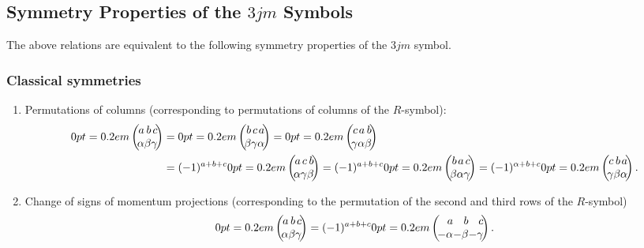 \subsection{Symmetry Properties of the $3 j m$ Symbols}\label{sec:8.4.2}
The above relations are equivalent to the following symmetry properties of the $3 j m$ symbol.

\subsubsection{Classical symmetries \cite{ref110}}
\begin{enumerate}[label=(\roman*)]
\item Permutations of columns (corresponding to permutations of columns of the $R$-symbol):
\begin{align}
\threej{a}{b}{c}{\alpha}{\beta}{\gamma}&=\threej{b}{c}{a}{\beta}{\gamma}{\alpha}=\threej{c}{a}{b}{\gamma}{\alpha}{\beta} \notag\\
& =(-1)^{a+b+c}\threej{a}{c}{b}{\alpha}{\gamma}{\beta}  
 =(-1)^{a+b+c}\threej{b}{a}{c}{\beta}{\alpha}{\gamma}=(-1)^{\alpha+b+c}\threej{c}{b}{a}{\gamma}{\beta}{\alpha}. \label{eq:8:4:5}
\end{align}
\item Change of signs of momentum projections (corresponding to the permutation of the second and third rows of the $R$-symbol)
\begin{equation}
\threej{a}{b}{c}{\alpha}{\beta}{\gamma}=(-1)^{a+b+c}\threej{a}{b}{c}{-\alpha}{-\beta}{-\gamma}. \label{eq:8:4:6}
\end{equation}

\end{enumerate}
